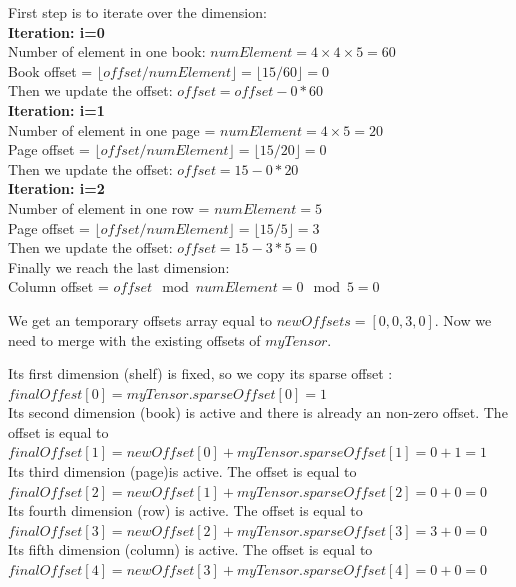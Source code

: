 	First step is to iterate over the dimension:\\
	\textbf{Iteration: i=0}\\
	Number of element in one book: $numElement = 4\times 4\times 5 = 60$ \\
	Book offset = $\lfloor offset/numElement\rfloor =  \lfloor 15/60\rfloor = 0$\\  
	Then we update the offset: $offset = offset - 0 * 60$\\
	\textbf{Iteration: i=1}\\
	Number of element in one page = $numElement = 4\times 5 = 20$ \\
	Page offset = $\lfloor offset/numElement\rfloor =  \lfloor 15/20\rfloor = 0$ \\ 
	Then we update the offset: $offset = 15 - 0 * 20$\\
	\textbf{Iteration: i=2}\\
	Number of element in one row = $numElement = 5$\\
	Page offset = $\lfloor offset/numElement\rfloor =  \lfloor 15/5\rfloor = 3$ \\ 
	Then we update the offset: $offset = 15 - 3 * 5 = 0$\\
	
	Finally we reach the last dimension:\\
	Column offset = $offset \mod numElement = 0 \mod 5 = 0$
	
	We get an temporary offsets array equal to $ newOffsets = [0, 0, 3, 0]$. Now we need to merge with the existing offsets of $myTensor$.
	
	Its first dimension (shelf) is fixed, so we copy its sparse offset :\\ $finalOffest[0] = myTensor.sparseOffset[0] = 1$\\
	Its second dimension (book) is active and there is already an non-zero offset. The offset is equal to\\ $finalOffset[1] = newOffset[0] + myTensor.sparseOffset[1] = 0 + 1 = 1$\\
	Its third dimension (page)is active. The offset is equal to\\ $finalOffset[2] = newOffset[1] + myTensor.sparseOffset[2] = 0 + 0 = 0$\\
	Its fourth dimension (row) is active. The offset is equal to\\ $finalOffset[3] = newOffset[2] + myTensor.sparseOffset[3] = 3 + 0 = 0$\\
	Its fifth dimension (column) is active. The offset is equal to\\ $finalOffset[4] = newOffset[3] + myTensor.sparseOffset[4] = 0 + 0 = 0$\\
	
